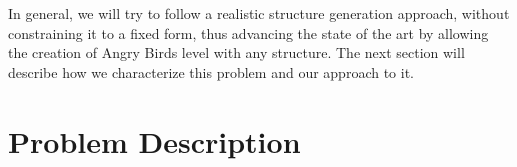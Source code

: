 \documentclass[runningheads,a4paper]{llncs}
\begin{document}
In general, we will try to follow a realistic structure generation
approach, without constraining it to a fixed form, thus advancing the
state of the art by allowing the creation of Angry Birds level with
any structure. The next section will describe how we characterize this
problem and our approach to it.

\section{Problem Description}
\label{sec:angry}



\end{document}
